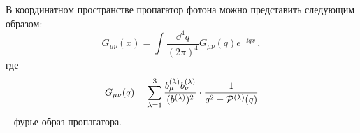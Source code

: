 В координатном пространстве пропагатор фотона можно представить следующим 
образом:
\begin{equation}\label{eq:InvGcFourier}
	G_{\mu\nu}(x)=\int \frac{\dd^4q}{(2\pi)^4}G_{\mu\nu}(q) e^{-\ii qx}\, ,
\end{equation}
где
\begin{equation}\label{eq:GcFourier}
	G_{\mu\nu}(q)=\sum_{\lambda=1}^{3}\frac{b_\mu^{(\lambda)}b^{(\lambda)}_\nu}{(b^{(\lambda)})^2}\cdot
	 \frac{1}{q^2-{\cal P}^{(\lambda)}(q)}
\end{equation}
-- фурье-образ пропагатора.


